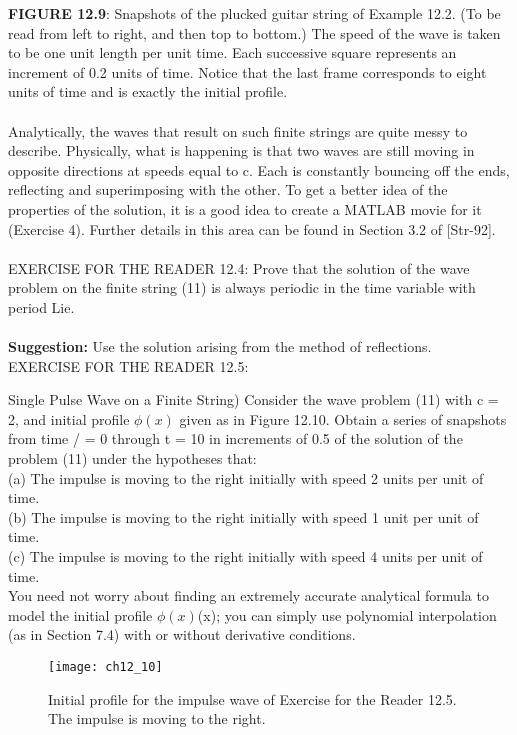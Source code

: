 \documentclass[../main.tex]{subfiles}
\begin{document}
{\textbf{FIGURE 12.9}: Snapshots of the plucked guitar string of Example 12.2. (To be read from 
left to right, and then top to bottom.) The speed of the wave is taken to be one unit length 
per unit time. Each successive square represents an increment of 0.2 units of time. Notice 
that the last frame corresponds to eight units of time and is exactly the initial profile. 
\\
\\
Analytically, the waves that result on such finite strings are quite messy to 
describe. Physically, what is happening is that two waves are still moving in 
opposite directions at speeds equal to c. Each is constantly bouncing off the ends, 
reflecting and superimposing with the other. To get a better idea of the properties of the solution, it is a good idea to create a MATLAB movie for it (Exercise 4). 
Further details in this area can be found in Section 3.2 of [Str-92].
\\
\\
EXERCISE FOR THE READER 12.4: Prove that the solution of the wave 
problem on the finite string (11) is always periodic in the time variable with period 
Lie.\\
\\
\textbf{Suggestion:} Use the solution arising from the method of reflections.\\
EXERCISE FOR THE READER 12.5: {Single Pulse Wave on a Finite String) 
Consider the wave problem (11) with c = 2, and initial profile $\phi(x)$ given as in 
Figure 12.10. Obtain a series of snapshots from time / = 0 through t = 10 in 
increments of 0.5 of the solution of the problem (11) under the hypotheses that:  
\\
(a) The impulse is moving to the right initially with speed 2 units per unit of time.
\\ 
(b) The impulse is moving to the right initially with speed 1 unit per unit of time.
\\ 
(c) The impulse is moving to the right initially with speed 4 units per unit of time.
\\
You need not worry about finding an extremely accurate analytical formula to 
model the initial profile  $\phi(x)$(x); you can simply use polynomial interpolation (as in 
Section 7.4) with or without derivative conditions. 
\begin{figure}[H]
	\centering
	\texttt{[image: ch12\_10]}
	\caption{\textsf{Initial profile for the impulse wave of Exercise for the Reader 12.5. The 
impulse is moving to the right. }}

\end{figure}}}
\end{document}
